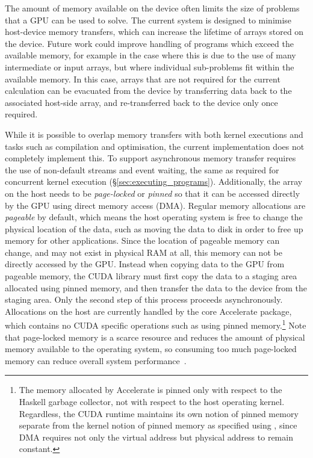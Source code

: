 The amount of memory available on the device often limits the size of problems
that a GPU can be used to solve. The current system is designed to minimise
host-device memory transfers, which can increase the lifetime of arrays stored
on the device. Future work could improve handling of programs which exceed the
available memory, for example in the case where this is due to the use of many
intermediate or input arrays, but where individual sub-problems fit within the
available memory. In this case, arrays that are not required for the current
calculation can be evacuated from the device by transferring data back to the
associated host-side array, and re-transferred back to the device only once
required.

While it is possible to overlap memory transfers with both kernel executions and
tasks such as compilation and optimisation, the current implementation does not
completely implement this. To support asynchronous memory transfer requires the
use of non-default streams and event waiting, the same as required for
concurrent kernel execution (\S\ref{sec:executing_programs}).
Additionally, the array on the host needs
to be \emph{page-locked} or \emph{pinned} so that it can be accessed directly by
the GPU using direct memory access (DMA). Regular memory allocations are
\emph{pageable} by default, which means the host operating system is free to
change the physical location of the data, such as moving the data to disk in
order to free up memory for other applications. Since the location of pageable
memory can change, and may not exist in physical RAM at all, this memory can not
be directly accessed by the GPU\@. Instead when copying data to the GPU from
pageable memory, the CUDA library must first copy the data to a staging area
allocated using pinned memory, and then transfer the data to the device from the
staging area. Only the second step of this process proceeds asynchronously.
Allocations on the host are currently handled by the core Accelerate package,
which contains no CUDA specific operations such as using pinned
memory.\footnote{The memory allocated by Accelerate is pinned only with respect
to the Haskell garbage collector, not with respect to the host operating kernel.
Regardless, the CUDA runtime maintains its own notion of pinned memory
separate from the kernel notion of pinned memory as specified using
, since DMA requires not only the virtual address but physical
address to remain constant.} Note that page-locked memory is a scarce resource
and reduces the amount of physical memory available to the operating system, so
consuming too much page-locked memory can reduce overall system
performance~\cite{NVIDIA:2012wf}.


